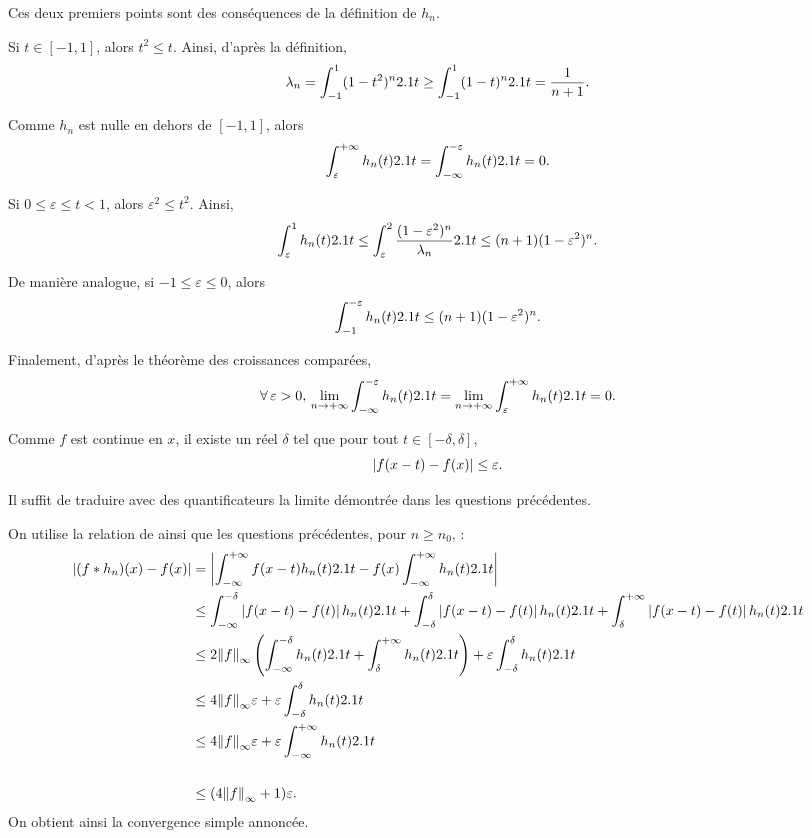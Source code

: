 \begin{demo}
\begin{questions}
\item Ces deux premiers points sont des conséquences de la définition de $h_n$.

\item Si $t \in [-1, 1]$, alors $t^2 \leq t$. Ainsi, d'après la définition,
\[
\lambda_n
= \int_{-1}^1 (1 - t^2)^n 2.1 t
\geq \int_{-1}^1 (1 - t)^n 2.1 t
= \frac{1}{n + 1}.
\]


\item Comme $h_n$ est nulle en dehors de $[-1, 1]$, alors 
\[
\int_\varepsilon^{+\infty} h_n(t) 2.1 t
= \int_{-\infty}^{-\varepsilon} h_n(t) 2.1 t
= 0.
\]

\item Si $0 \leq \varepsilon \leq t < 1$, alors $\varepsilon^2 \leq t^2$. Ainsi,
\[
\int_\varepsilon^1 h_n(t) 2.1 t
\leq \int_\varepsilon^2 \frac{(1 - \varepsilon^2)^n}{\lambda_n} 2.1 t
\leq (n + 1) (1 - \varepsilon^2)^n.
\]

De manière analogue, si $-1 \leq \varepsilon \leq 0$, alors
\[
\int_{-1}^{-\varepsilon} h_n(t) 2.1 t \leq (n + 1) (1 - \varepsilon^2)^n.
\]

\item Finalement, d'après le théorème des croissances comparées,
\[
\forall \varepsilon > 0,\,
\displaystyle\lim_{n\to+\infty} \int_{-\infty}^{-\varepsilon} h_n(t) \d t
= \displaystyle\lim_{n\to+\infty} \int_{\varepsilon}^{+\infty} h_n(t) \d t
= 0.
\]

\item Comme $f$ est continue en $x$, il existe un réel $\delta$ tel que pour tout $t \in [-\delta, \delta]$,
\[
\left| f(x - t) - f(x) \right| \leq \varepsilon.
\]

\item Il suffit de traduire avec des quantificateurs la limite démontrée dans les questions précédentes.

\item On utilise la relation de  ainsi que les questions précédentes, pour $n \geq n_0$, :
\begin{align*}
\left| (f \ast h_n)(x) - f(x) \right|
&= \left| \int_{-\infty}^{+\infty} f(x - t) h_n(t) 2.1 t - f(x) \int_{-\infty}^{+\infty} h_n(t) 2.1 t \right|\\
&\leq
\int_{-\infty}^{-\delta} \left| f(x - t) - f(t) \right| h_n(t) 2.1 t
+ \int_{-\delta}^{\delta} \left| f(x - t) - f(t) \right| h_n(t) 2.1 t
+ \int_{\delta}^{+\infty} \left| f(x - t) - f(t) \right| h_n(t) 2.1 t\\
&\leq 2 \norm{f}_{\infty} \left(\int_{-\infty}^{-\delta} h_n(t) 2.1 t + \int_{\delta}^{+\infty} h_n(t) 2.1 t\right) + \varepsilon \int_{-\delta}^{\delta} h_n(t) 2.1 t\\
&\leq 4 \norm{f}_{\infty} \varepsilon + \varepsilon \int_{-\delta}^{\delta} h_n(t) 2.1 t\\
&\leq 4 \norm{f}_{\infty} \varepsilon + \varepsilon \int_{-\infty}^{+\infty} h_n(t) 2.1 t\\\\
&\leq (4 \norm{f}_\infty + 1) \varepsilon.
\end{align*}
On obtient ainsi la convergence simple annoncée.
\end{questions}
\end{demo}